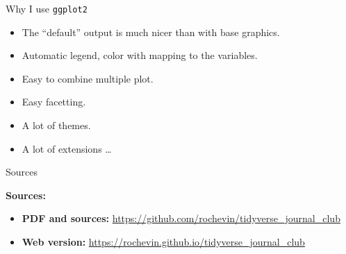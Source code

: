 \documentclass[14pt,ignorenonframetext,]{bredelebeamer}
\providecommand{\tightlist}{%
  \setlength{\itemsep}{0pt}\setlength{\parskip}{0pt}}
\begin{document}
\begin{frame}{Why I use \texttt{ggplot2}}

\Large

\begin{itemize}
\tightlist
\item
  The ``default'' output is much nicer than with base graphics.
\item
  Automatic legend, color with mapping to the variables.
\item
  Easy to combine multiple plot.
\item
  Easy facetting.
\item
  A lot of themes.
\item
  A lot of extensions \ldots{}
\end{itemize}

\end{frame}

\begin{frame}{Sources}

\Large

\textbf{Sources:}

\begin{itemize}
\tightlist
\item
  \textbf{PDF and sources:}
  \url{https://github.com/rochevin/tidyverse_journal_club}
\item
  \textbf{Web version:}
  \url{https://rochevin.github.io/tidyverse_journal_club}
\end{itemize}

\end{frame}
\end{document}
